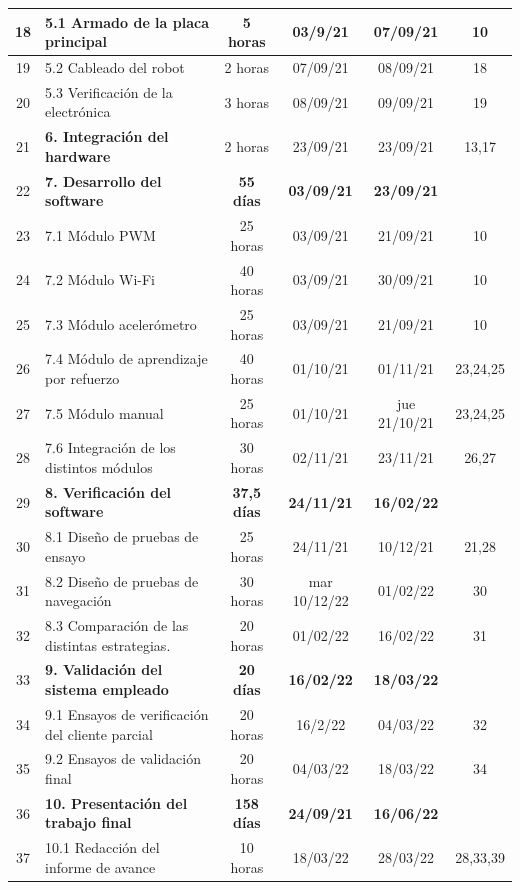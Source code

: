\documentclass[
11pt, %
codirector, %
]{charter}
\begin{document}
\begin{table}[htbp]
{\begin{tabular}{|c|p{25em}|c|c|c|c|}
\hline 18 & 5.1 Armado de la placa principal & 5 horas & 03/9/21 & 07/09/21 & 10 \\
\hline 19 & 5.2 Cableado del robot & 2 horas & 07/09/21 & 08/09/21 & 18 \\
\hline 20 & 5.3 Verificación de la electrónica & 3 horas & 08/09/21 & 09/09/21 & 19 \\
\hline 21 & \textbf {6. Integración del hardware} & 2 horas & 23/09/21 & 23/09/21 & 13,17 \\
\hline 22 & \textbf{7. Desarrollo del software} & \textbf{55 días} & \textbf{03/09/21} & \textbf{23/09/21} &  \\
\hline 23 & 7.1 Módulo PWM & 25 horas & 03/09/21 & 21/09/21 & 10 \\
\hline 24 & 7.2 Módulo Wi-Fi & 40 horas & 03/09/21 & 30/09/21 & 10 \\
\hline 25 & 7.3 Módulo acelerómetro & 25 horas & 03/09/21 & 21/09/21 & 10 \\
\hline 26 & 7.4 Módulo de aprendizaje por refuerzo & 40 horas & 01/10/21 & 01/11/21 & 23,24,25  \\
\hline 27 & 7.5 Módulo manual & 25 horas & 01/10/21 & jue 21/10/21 & 23,24,25 \\
\hline 28 & 7.6 Integración de los distintos módulos & 30 horas & 02/11/21 & 23/11/21 & 26,27 \\
\hline 29 & \textbf{8. Verificación del software} & \textbf{37,5 días} & \textbf{24/11/21} & \textbf{16/02/22} &  \\
\hline 30 & 8.1 Diseño de pruebas de ensayo & 25 horas & 24/11/21 & 10/12/21 & 21,28 \\
\hline 31 & 8.2 Diseño de pruebas de navegación & 30 horas & mar 10/12/22 & 01/02/22 & 30 \\
\hline 32 & 8.3 Comparación de las distintas estrategias. & 20 horas & 01/02/22 & 16/02/22 & 31 \\
\hline 33 & \textbf{9. Validación del sistema empleado} & \textbf{20 días} & \textbf{16/02/22} & \textbf{18/03/22} &  \\
\hline 34 & 9.1 Ensayos de verificación del cliente parcial & 20 horas & 16/2/22 & 04/03/22 & 32 \\
\hline 35 & 9.2 Ensayos de validación final & 20 horas & 04/03/22 & 18/03/22 & 34 \\
\hline 36 & \textbf{10. Presentación del trabajo final} & \textbf{158 días} & \textbf{24/09/21} & \textbf{16/06/22} &  \\
\hline 37 & 10.1 Redacción del informe de avance & 10 horas & 18/03/22 & 28/03/22 & 28,33,39 \\

\end{tabular}}
\end{table}
\end{document}
